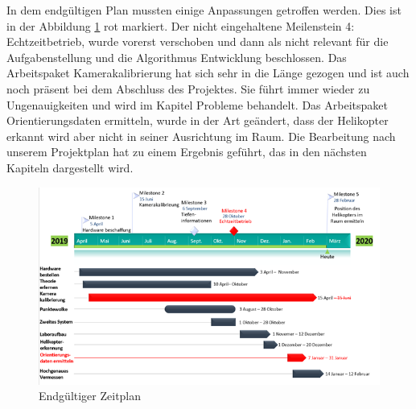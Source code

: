\noindent In dem endgültigen Plan mussten einige Anpassungen getroffen werden. Dies ist in der Abbildung \ref{fig:ms2} rot markiert. Der nicht eingehaltene Meilenstein 4: Echtzeitbetrieb, wurde vorerst verschoben und dann als nicht relevant für die Aufgabenstellung und die Algorithmus Entwicklung beschlossen. Das Arbeitspaket Kamerakalibrierung hat sich sehr in die Länge gezogen und ist auch noch präsent bei dem Abschluss des Projektes. Sie führt immer wieder zu Ungenauigkeiten und wird im Kapitel Probleme behandelt. Das Arbeitspaket Orientierungsdaten ermitteln, wurde in der Art geändert, dass der Helikopter erkannt wird aber nicht in seiner Ausrichtung im Raum. Die Bearbeitung nach unserem Projektplan hat zu einem Ergebnis geführt, das in den nächsten Kapiteln dargestellt wird. 

\begin{figure}[H]
	\includegraphics[scale=1.4]{bilder/ms2}
	\caption[Endgültiger Zeitplan ]{Endgültiger Zeitplan }
	\label{fig:ms2}
\end{figure}